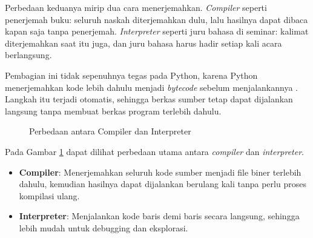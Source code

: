 Perbedaan keduanya mirip dua cara menerjemahkan. \textit{Compiler} seperti penerjemah buku: seluruh naskah diterjemahkan dulu, lalu hasilnya dapat dibaca kapan saja tanpa penerjemah. \textit{Interpreter} seperti juru bahasa di seminar: kalimat diterjemahkan saat itu juga, dan juru bahasa harus hadir setiap kali acara berlangsung.

Pembagian ini tidak sepenuhnya tegas pada Python, karena Python menerjemahkan kode lebih dahulu menjadi \textit{bytecode} sebelum menjalankannya \cite{py-glossary-interpreted}. Langkah itu terjadi otomatis, sehingga berkas sumber tetap dapat dijalankan langsung tanpa membuat berkas program terlebih dahulu.

\begin{figure}[H]
	\centering
	\caption{Perbedaan antara Compiler dan Interpreter}
	\label{fig:compiler-vs-interpreter}
\end{figure}

\noindent
Pada Gambar \ref{fig:compiler-vs-interpreter} dapat dilihat perbedaan
utama antara \textit{compiler} dan \textit{interpreter}.  
\begin{itemize}
	\item \textbf{Compiler}: Menerjemahkan seluruh kode sumber menjadi file biner terlebih dahulu, kemudian hasilnya dapat dijalankan berulang kali tanpa perlu proses kompilasi ulang.
	\item \textbf{Interpreter}: Menjalankan kode baris demi baris secara langsung, sehingga lebih mudah untuk debugging dan eksplorasi.
\end{itemize}

